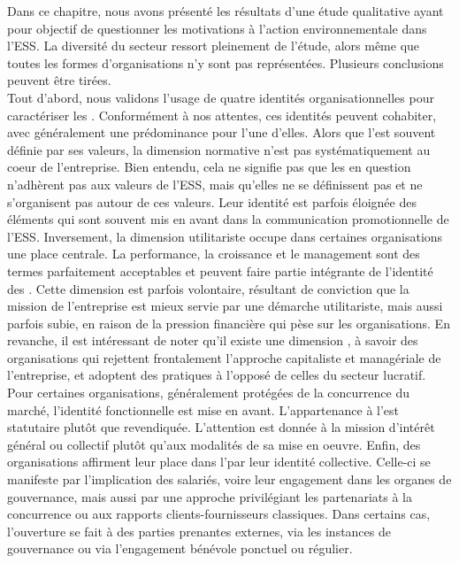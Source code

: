 Dans ce chapitre, nous avons présenté les résultats d'une étude qualitative ayant pour objectif de questionner les motivations à l'action environnementale dans l'ESS. La diversité du secteur ressort pleinement de l'étude, alors même que toutes les formes d'organisations n'y sont pas représentées. Plusieurs conclusions peuvent être tirées. \\

Tout d'abord, nous validons l'usage de quatre identités organisationnelles pour caractériser les \oess. Conformément à nos attentes, ces identités peuvent cohabiter, avec généralement une prédominance pour l'une d'elles. Alors que l'\ess est souvent définie par ses valeurs, la dimension normative n'est pas systématiquement au coeur de l'entreprise. Bien entendu, cela ne signifie pas que les \eess en question n'adhèrent pas aux valeurs de l'ESS, mais qu'elles ne se définissent pas et ne s'organisent pas autour de ces valeurs. Leur identité est parfois éloignée des éléments qui sont souvent mis en avant dans la communication promotionnelle de l'ESS. Inversement, la dimension utilitariste occupe dans certaines organisations une place centrale. La performance, la croissance et le management sont des termes parfaitement acceptables et peuvent faire partie intégrante de l'identité des \eess. Cette dimension est parfois volontaire, résultant de conviction que la mission de l'entreprise est mieux servie par une démarche utilitariste, mais aussi parfois subie, en raison de la pression financière qui pèse sur les organisations. En revanche, il est intéressant de noter qu'il existe une dimension , à savoir des organisations qui rejettent frontalement l'approche capitaliste et managériale de l'entreprise, et adoptent des pratiques à l'opposé de celles du secteur lucratif. Pour certaines organisations, généralement protégées de la concurrence du marché, l'identité fonctionnelle est mise en avant. L'appartenance à l'\ess est statutaire plutôt que revendiquée. L'attention est donnée à la mission d'intérêt général ou collectif plutôt qu'aux modalités de sa mise en oeuvre. Enfin, des organisations affirment leur place dans l'\ess par leur identité collective. Celle-ci se manifeste par l'implication des salariés, voire leur engagement dans les organes de gouvernance, mais aussi par une approche privilégiant les partenariats à la concurrence ou aux rapports clients-fournisseurs classiques. Dans certains cas, l'ouverture se fait à des parties prenantes externes, via les instances de gouvernance ou via l'engagement bénévole ponctuel ou régulier. \\

